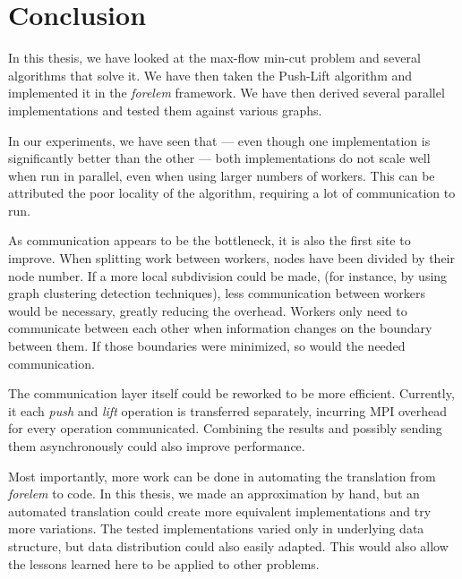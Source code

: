 \chapter{Conclusion}

In this thesis, we have looked at the max-flow min-cut problem and several algorithms that solve it. We have then taken the Push-Lift algorithm and implemented it in the \emph{forelem} framework. We have then derived several parallel implementations and tested them against various graphs.

In our experiments, we have seen that --- even though one implementation is significantly better than the other --- both implementations do not scale well when run in parallel, even when using larger numbers of workers. This can be attributed the poor locality of the algorithm, requiring a lot of communication to run.

As communication appears to be the bottleneck, it is also the first site to improve. When splitting work between workers, nodes have been divided by their node number. If a more local subdivision could be made, (for instance, by using graph clustering detection techniques), less communication between workers would be necessary, greatly reducing the overhead. Workers only need to communicate between each other when information changes on the boundary between them. If those boundaries were minimized, so would the needed communication.

The communication layer itself could be reworked to be more efficient. Currently, it each \emph{push} and \emph{lift} operation is transferred separately, incurring MPI overhead for every operation communicated. Combining the results and possibly sending them asynchronously could also improve performance.

Most importantly, more work can be done in automating the translation from \emph{forelem} to code. In this thesis, we made an approximation by hand, but an automated translation could create more equivalent implementations and try more variations. The tested implementations varied only in underlying data structure, but data distribution could also easily adapted. This would also allow the lessons learned here to be applied to other problems.
